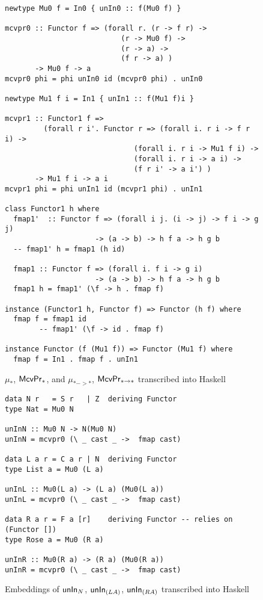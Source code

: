 \begin{figure}
\begin{singlespace}
\begin{lstlisting}
newtype Mu0 f = In0 { unIn0 :: f(Mu0 f) }

mcvpr0 :: Functor f => (forall r. (r -> f r) ->
                           (r -> Mu0 f) ->
                           (r -> a) ->
                           (f r -> a) )
       -> Mu0 f -> a
mcvpr0 phi = phi unIn0 id (mcvpr0 phi) . unIn0

newtype Mu1 f i = In1 { unIn1 :: f(Mu1 f)i }

mcvpr1 :: Functor1 f =>
         (forall r i'. Functor r => (forall i. r i -> f r i) ->
                              (forall i. r i -> Mu1 f i) ->
                              (forall i. r i -> a i) ->
                              (f r i' -> a i') )
       -> Mu1 f i -> a i
mcvpr1 phi = phi unIn1 id (mcvpr1 phi) . unIn1

class Functor1 h where
  fmap1'  :: Functor f => (forall i j. (i -> j) -> f i -> g j)
                     -> (a -> b) -> h f a -> h g b
  -- fmap1' h = fmap1 (h id)

  fmap1 :: Functor f => (forall i. f i -> g i)
                     -> (a -> b) -> h f a -> h g b
  fmap1 h = fmap1' (\f -> h . fmap f)

instance (Functor1 h, Functor f) => Functor (h f) where
  fmap f = fmap1 id
        -- fmap1' (\f -> id . fmap f)

instance Functor (f (Mu1 f)) => Functor (Mu1 f) where
  fmap f = In1 . fmap f . unIn1
\end{lstlisting}
\end{singlespace}
\caption{$\mu_{*}$, $\mathsf{McvPr}_{*}$, and $\mu_{* -> *}$, $\mathsf{McvPr}_{* -> *}$
	transcribed into Haskell}
\label{fig:HaskellFunctor1}
\end{figure}

\begin{figure}
\begin{lstlisting}
data N r   = S r   | Z  deriving Functor
type Nat = Mu0 N

unInN :: Mu0 N -> N(Mu0 N)
unInN = mcvpr0 (\ _ cast _ ->  fmap cast)

data L a r = C a r | N  deriving Functor
type List a = Mu0 (L a)

unInL :: Mu0(L a) -> (L a) (Mu0(L a))
unInL = mcvpr0 (\ _ cast _ ->  fmap cast)

data R a r = F a [r]    deriving Functor -- relies on (Functor [])
type Rose a = Mu0 (R a)

unInR :: Mu0(R a) -> (R a) (Mu0(R a))
unInR = mcvpr0 (\ _ cast _ ->  fmap cast)
\end{lstlisting}
\caption{Embeddings of $\mathsf{unIn}_N$, $\mathsf{unIn}_{(L A)}$, $\mathsf{unIn}_{(R A)}$
	transcribed into Haskell}
\label{fig:HaskellunInRegular}
\end{figure}

